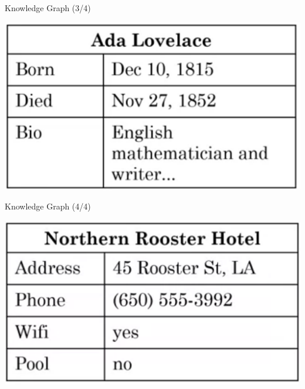 \documentclass[pdf]{beamer}
\theoremstyle{mystyle}
\begin{document}
\begin{frame}{Knowledge Graph (3/4)}
	\begin{center}
		\includegraphics[scale=.35]{knowledge-graph-1}
	\end{center}
\end{frame}

\begin{frame}{Knowledge Graph (4/4)}
	\begin{center}
		\includegraphics[scale=.35]{knowledge-graph-2}
	\end{center}
\end{frame}














\end{document}
